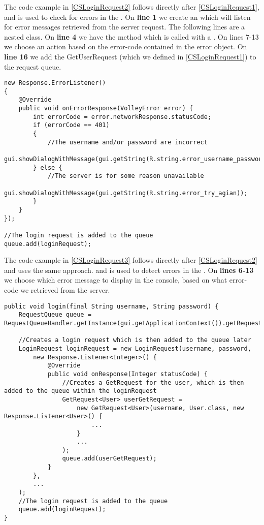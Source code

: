 The code example in \autoref{CSLoginRequest2} follows directly after
\autoref{CSLoginRequest1}, and is used to check for errors in the
. On \textbf{line 1} we create an 
which will listen for error messages retrieved from the server request. The
following lines are a nested class. On \textbf{line 4} we have the
 method which is called with a . On
lines {7-13} we choose an action based on the error-code contained in the error
object. On \textbf{line 16} we add the GetUserRequest (which we defined in
\autoref{CSLoginRequest1}) to the request queue.\nl

\begin{minipage}[H]{\linewidth}
\begin{lstlisting}[caption = Using an errorListener to detect mishaps in the LoginRequest, label = CSLoginRequest3] 
new Response.ErrorListener() 
{
	@Override
    public void onErrorResponse(VolleyError error) {
        int errorCode = error.networkResponse.statusCode;
        if (errorCode == 401) 
        {
        	//The username and/or password are incorrect
            gui.showDialogWithMessage(gui.getString(R.string.error_username_password));
        } else {
            //The server is for some reason unavailable
            gui.showDialogWithMessage(gui.getString(R.string.error_try_agian));
        }
    }
});

//The login request is added to the queue
queue.add(loginRequest);
\end{lstlisting}
\end{minipage}

The code example in \autoref{CSLoginRequest3} follows directly after
\autoref{CSLoginRequest2} and uses the same approach. and is used to detect
errors in the . On \textbf{lines 6-13} we choose which error
message to display in the console, based on what error-code we retrieved from
the server.

\begin{minipage}[H]{\linewidth}
\begin{lstlisting}[caption = Using a RequestQueue to commicate with the server,
label = RequestQueue]
public void login(final String username, String password) {
    RequestQueue queue = RequestQueueHandler.getInstance(gui.getApplicationContext()).getRequestQueue();

    //Creates a login request which is then added to the queue later
    LoginRequest loginRequest = new LoginRequest(username, password,
        new Response.Listener<Integer>() {
            @Override
            public void onResponse(Integer statusCode) {
                //Creates a GetRequest for the user, which is then added to the queue within the loginRequest
                GetRequest<User> userGetRequest =
                    new GetRequest<User>(username, User.class, new Response.Listener<User>() {
                       	...
                    }
                    ...
                );
                queue.add(userGetRequest);
            }
        },
		...
    );
    //The login request is added to the queue
    queue.add(loginRequest);
}
\end{lstlisting}
\end{minipage}

